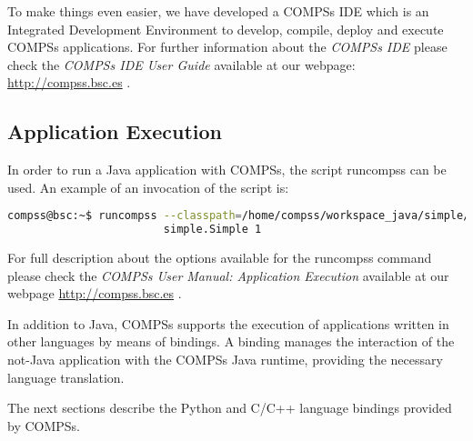 
To make things even easier, we have developed a COMPSs IDE which is an Integrated Development Environment to develop, compile,
deploy and execute COMPSs applications. For further information about the \textit{COMPSs IDE} please check the \textit{COMPSs IDE
User Guide} available at our webpage: \url{http://compss.bsc.es} .


\subsection{Application Execution}
In order to run a Java application with COMPSs, the script runcompss can be used. An example of an invocation of the script is:

\begin{lstlisting}[language=bash]
compss@bsc:~$ runcompss --classpath=/home/compss/workspace_java/simple/jar/simple.jar 
                        simple.Simple 1
\end{lstlisting}

For full description about the options available for the runcompss command please check the \textit{COMPSs User Manual: Application
Execution} available at our webpage \url{http://compss.bsc.es} . 
\newline
~ \newline

In addition to Java, COMPSs supports the execution of applications written in other languages by 
means of bindings. A binding manages the interaction of the not-Java application with the COMPSs 
Java runtime, providing the necessary language translation.

The next sections describe the Python and C/C++ language bindings provided by COMPSs.
